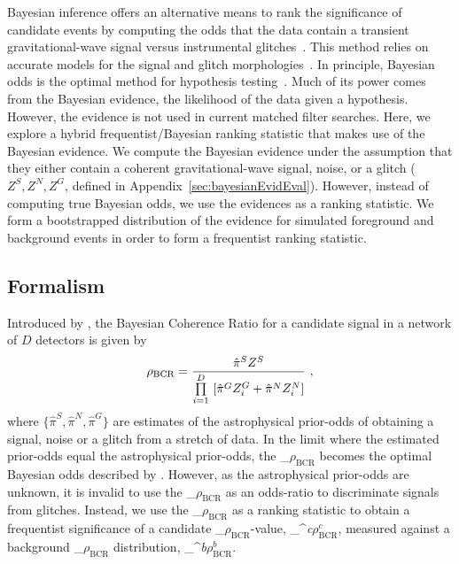 \documentclass[%
 nofootinbib,
 amsmath,amssymb,
 aps,
 twocolumn,
 superscriptaddress
]{revtex4-2}
\newcommand{\mathcmd}[1]{{\sc \relax\ifmmode#1\else $#1$\fi}\xspace}
\newcommand{\bcr}{\mathcmd{\rho_\text{BCR}}}
\newcommand{\bgrdbcr}{\mathcmd{\rho_\text{BCR}^\textit{b}}}
\newcommand{\candbcr}{\mathcmd{\rho_\text{BCR}^\textit{c}}}
\begin{document}
Bayesian inference offers an alternative means to rank the significance of candidate events by computing the odds that the data contain a transient gravitational-wave signal versus instrumental glitches~\cite{BCR1}. This method relies on accurate models for the signal and glitch morphologies~\cite{BCR1}. In principle, Bayesian odds is the optimal method for hypothesis testing~\cite{BCR2}. Much of its power comes from the Bayesian evidence, the likelihood of the data given a hypothesis. However, the evidence is not used in current matched filter searches. Here, we explore a hybrid frequentist/Bayesian ranking statistic that makes use of the Bayesian evidence. We compute the Bayesian evidence under the assumption that they either contain a coherent gravitational-wave signal, noise, or a glitch ($Z^S, Z^N, Z^G$, defined in Appendix~\ref{sec:bayesianEvidEval}). However, instead of computing true Bayesian odds, we use the evidences as a ranking statistic. We form a bootstrapped distribution of the evidence for simulated foreground and background events in order to form a frequentist ranking statistic.

\subsection{Formalism}

Introduced by \citet{BCR1}, the Bayesian Coherence Ratio for a candidate signal in a network of $D$ detectors is given by
\begin{equation}
\label{eq:bcr}
\bcr = \frac{\hat{\pi}^S Z^S}{\prod\limits^D_{i=1} \ [\hat{\pi}^G Z^G_i + \hat{\pi}^N Z^N_i]}\  ,
\end{equation}
where $\{\hat{\pi}^S, \hat{\pi}^N, \hat{\pi}^G\}$ are estimates of the astrophysical prior-odds of obtaining a signal, noise or a glitch from a stretch of data. In the limit where the estimated prior-odds equal the astrophysical prior-odds, the \bcr becomes the optimal Bayesian odds described by \citet{BCR2}.  However, as the astrophysical prior-odds are unknown, it is invalid to use the \bcr as an odds-ratio to discriminate signals from glitches. Instead, we use the \bcr as a ranking statistic to obtain a frequentist significance of a candidate \bcr-value, \candbcr, measured against a background \bcr distribution, \bgrdbcr. 
\end{document}
